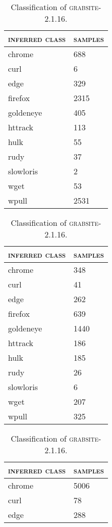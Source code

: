 \begin{table}[H]
	\centering
	\begin{subtable}{.45\linewidth}
		\centering
	\begin{tabular}{ll}
		\toprule
		\textsc{inferred class} & \textsc{samples}\\
		\midrule
		chrome & 688\\
		curl & 6\\
		edge & 329\\
		firefox & 2315\\
		goldeneye & 405\\
		httrack & 113\\
		hulk & 55\\
		rudy & 37\\
		slowloris & 2\\
		wget & 53\\
		wpull & 2531\\
		\bottomrule
	\end{tabular}
	\caption{Classification of \textsc{firefox-68.0}.}
	\end{subtable}
	\begin{subtable}{.45\linewidth}
		\centering
	\begin{tabular}{ll}
		\toprule
		\textsc{inferred class} & \textsc{samples}\\
		\midrule
		chrome & 348\\
		curl & 41\\
		edge & 262\\
		firefox & 639\\
		goldeneye & 1440\\
		httrack & 186\\
		hulk & 185\\
		rudy & 26\\
		slowloris & 6\\
		wget & 207\\
		wpull & 325\\
		\bottomrule
	\end{tabular}
	\caption{Classification of \textsc{grabsite-2.1.16}.}
	\end{subtable}
	\begin{subtable}{.45\linewidth}
		\centering
	\begin{tabular}{ll}
		\toprule
		\textsc{inferred class} & \textsc{samples}\\
		\midrule
		chrome & 5006\\
		curl & 78\\
		edge & 288\\

\end{tabular}
\end{subtable}
\end{table}
